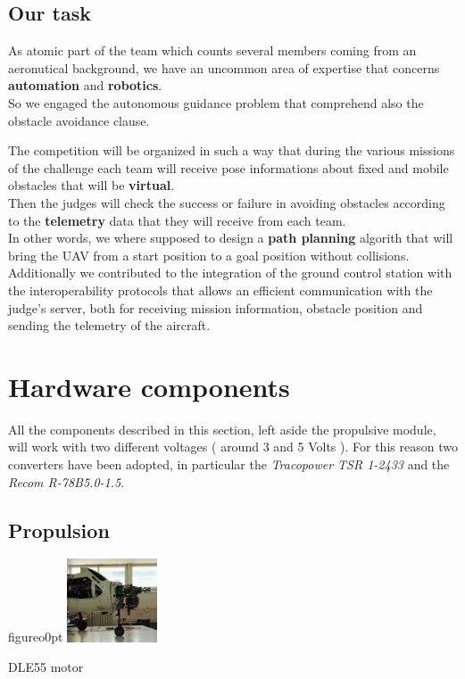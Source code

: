 \documentclass[oneside,onecolumn]{article}
\begin{document}
\subsection{Our task}
As atomic part of the team which counts several members coming from an
aeronutical background, we have an uncommon area of expertise that concerns
\textbf{automation} and \textbf{robotics}.\\ So we engaged the autonomous guidance problem that
comprehend also the obstacle avoidance clause.\par
The competition will be organized in such a way that during the various missions
of the challenge each team will receive pose informations about fixed and mobile
obstacles that will be \textbf{virtual}.\\
Then the judges will check the success or failure in avoiding obstacles
according to the \textbf{telemetry} data that they will receive from each team.\\
In other words, we where supposed to design a \textbf{path planning} algorith
that will bring the UAV from a start position to a goal position without
collisions.\\
Additionally we contributed to the integration of the ground control station
with the interoperability protocols that allows an efficient communication with
the judge's server, both for receiving mission information, obstacle position
and sending the telemetry of the aircraft.


\section{Hardware components}
All the components described in this section, left aside the propulsive module,
will work with two different voltages ( around 3 and 5 Volts ). For this reason
two converters have been adopted, in particular the \textit{Tracopower TSR 1-2433
 } and the \textit{Recom R-78B5.0-1.5}.
\subsection{Propulsion}
\begin{wrapfloat}{figure}{o}{0pt}
  \includegraphics[width=0.2\textwidth]{YAK3}
  \caption{DLE55 motor}\label{wrap-fig:2}
\end{wrapfloat} 
\end{document}

